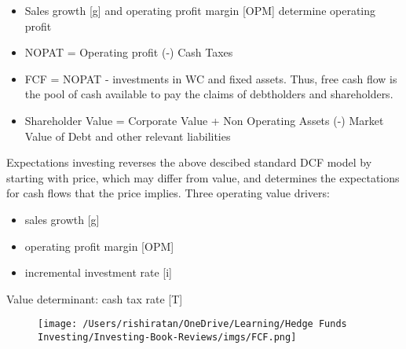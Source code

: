 \documentclass[english,titlepage]{article}
\begin{document}
\begin{itemize}
    \item Sales growth [g] and operating profit margin [OPM] determine operating profit
    \item NOPAT = Operating profit (-) Cash Taxes
    \item FCF = NOPAT - investments in WC and fixed assets. Thus, free cash flow is the pool of cash available to pay the claims of debtholders and shareholders. 
    \item Shareholder Value = Corporate Value + Non Operating Assets (-) Market Value of Debt and other relevant liabilities
\end{itemize}

\begin{tcolorbox}[colback=blue!5!white,colframe=blue!75!black]
Expectations investing reverses the above descibed standard DCF model by starting with price, which may differ from value, and determines the expectations for cash flows that the price implies. 
\vspace {0.3 cm}
  \newline
Three operating value drivers: 
\begin{itemize}
    \item sales growth [g]
    \item operating profit margin [OPM]
    \item incremental investment rate [i]
\end{itemize}
Value determinant: cash tax rate [T]
\end{tcolorbox}
\begin{figure}[H]
    \centering
    \texttt{[image: /Users/rishiratan/OneDrive/Learning/Hedge Funds Investing/Investing-Book-Reviews/imgs/FCF.png]}
\end{figure}
\end{document}
